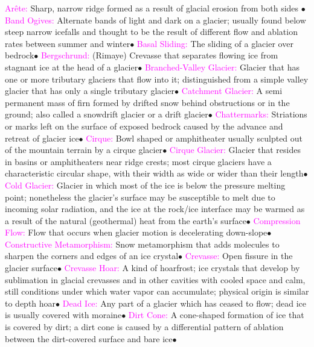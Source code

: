 \documentclass{article}
\newcommand{\ddd}{$\bullet$}
\newcommand{\pink}[1]{\textcolor{magenta}{#1}}
\newcommand{\vocab}[1]{{\pink{#1}}}
\begin{document}
\begin{multicols*}{4}
		\vocab{        Arête: } Sharp, narrow ridge formed as a result of glacial erosion from both sides \ddd 
		\vocab{        Band Ogives: } Alternate bands of light and dark on a glacier; usually found below steep narrow icefalls and thought to be the result of different flow and ablation rates between summer and winter\ddd
		\vocab{        Basal Sliding: } The sliding of a glacier over bedrock\ddd
		\vocab{        Bergschrund: } (Rimaye) Crevasse that separates flowing ice from stagnant ice at the head of a glacier\ddd
		\vocab{        Branched-Valley Glacier: } Glacier that has one or more tributary glaciers that flow into it; distinguished from a simple valley glacier that has only a single tributary glacier\ddd
		\vocab{        Catchment Glacier: } A semi permanent mass of firn formed by drifted snow behind obstructions or in the ground; also called a snowdrift glacier or a drift glacier\ddd
		\vocab{        Chattermarks: } Striations or marks left on the surface of exposed bedrock caused by the advance and retreat of glacier ice\ddd
		\vocab{        Cirque: } Bowl shaped or amphitheater usually sculpted out of the mountain terrain by a cirque glacier\ddd
		\vocab{        Cirque Glacier: } Glacier that resides in basins or amphitheaters near ridge crests; most cirque glaciers have a characteristic circular shape, with their width as wide or wider than their length\ddd
		\vocab{        Cold Glacier: } Glacier in which most of the ice is below the pressure melting point; nonetheless the glacier’s surface may be susceptible to melt due to incoming solar radiation, and the ice at the rock/ice interface may be warmed as a result of the natural (geothermal) heat from the earth’s surface\ddd
		\vocab{        Compression Flow: } Flow that occurs when glacier motion is decelerating down-slope\ddd
		\vocab{        Constructive Metamorphism: } Snow metamorphism that adds molecules to sharpen the corners and edges of an ice crystal\ddd
		\vocab{        Crevasse: } Open fissure in the glacier surface\ddd
		\vocab{        Crevasse Hoar: } A kind of hoarfrost; ice crystals that develop by sublimation in glacial crevasses and in other cavities with cooled space and calm, still conditions under which water vapor can accumulate; physical origin is similar to depth hoar\ddd
		\vocab{        Dead Ice: } Any part of a glacier which has ceased to flow; dead ice is usually covered with moraine\ddd
		\vocab{        Dirt Cone: } A cone-shaped formation of ice that is covered by dirt; a dirt cone is caused by a differential pattern of ablation between the dirt-covered surface and bare ice\ddd

\end{multicols*}
\end{document}
